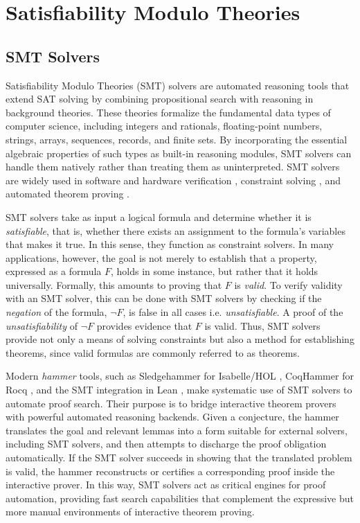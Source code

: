 \chapter{Satisfiability Modulo Theories}\label{ch:smt}


\section{SMT Solvers}

Satisfiability Modulo Theories (SMT) solvers are automated reasoning tools that extend SAT solving \cite{chaff,minitsat} by combining propositional search with reasoning in background theories.
These theories formalize the fundamental data types of computer science, including integers and rationals, floating-point numbers, strings, arrays, sequences, records, and finite sets.
By incorporating the essential algebraic properties of such types as built-in reasoning modules, SMT solvers can handle them natively rather than treating them as uninterpreted.
SMT solvers are widely used in software and hardware verification \cite{application-smt-hardware}, constraint solving \cite{awssmt,application-smt2}, and automated theorem proving \cite{coqhammer1,Sledgehammer}.

SMT solvers take as input a logical formula and determine whether it is \emph{satisfiable}, that is, whether there exists an assignment to the formula's variables that makes it true.
In this sense, they function as constraint solvers.
In many applications, however, the goal is not merely to establish that a property, expressed as a formula $F$, holds in some instance, but rather that it holds universally.
Formally, this amounts to proving that $F$ is \emph{valid}. To verify validity with an SMT solver, this can be done with SMT solvers by checking
if the \emph{negation} of the formula, $\neg F$,  is false in all cases i.e. \emph{unsatisfiable}. A proof of the \emph{unsatisfiability} of $\neg F$ provides evidence that $F$ is valid.
Thus, SMT solvers provide not only a means of solving constraints but also a method for establishing theorems, since valid formulas are commonly referred to as theorems.

Modern \emph{hammer} tools, such as Sledgehammer \cite{Sledgehammer} for Isabelle/HOL \cite{isabelle-hol-ref}, CoqHammer \cite{coqhammer1} for Rocq \cite{Rocq-refman}, and the SMT integration in Lean \cite{lean-smt}, make systematic use of SMT solvers to automate proof search.
Their purpose is to bridge interactive theorem provers with powerful automated reasoning backends.
Given a conjecture, the hammer translates the goal and relevant lemmas into a form suitable for external solvers, including SMT solvers, and then attempts to discharge the proof obligation automatically.
If the SMT solver succeeds in showing that the translated problem is valid, the hammer reconstructs or certifies a corresponding proof inside the interactive prover.
In this way, SMT solvers act as critical engines for proof automation, providing fast search capabilities that complement the expressive but more manual environments of interactive theorem proving.

